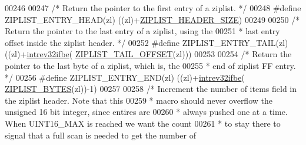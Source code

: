 \begin{DoxyCode}
00246 
00247 \textcolor{comment}{/* Return the pointer to the first entry of a ziplist. */}
00248 \textcolor{preprocessor}{#}\textcolor{preprocessor}{define} \textcolor{preprocessor}{ZIPLIST\_ENTRY\_HEAD}\textcolor{preprocessor}{(}\textcolor{preprocessor}{zl}\textcolor{preprocessor}{)}  \textcolor{preprocessor}{(}\textcolor{preprocessor}{(}\textcolor{preprocessor}{zl}\textcolor{preprocessor}{)}\textcolor{preprocessor}{+}\hyperlink{ziplist_8c_a3b8ef40d77ce00bcad424d0c07e2de95}{ZIPLIST\_HEADER\_SIZE}\textcolor{preprocessor}{)}
00249 
00250 \textcolor{comment}{/* Return the pointer to the last entry of a ziplist, using the}
00251 \textcolor{comment}{ * last entry offset inside the ziplist header. */}
00252 \textcolor{preprocessor}{#}\textcolor{preprocessor}{define} \textcolor{preprocessor}{ZIPLIST\_ENTRY\_TAIL}\textcolor{preprocessor}{(}\textcolor{preprocessor}{zl}\textcolor{preprocessor}{)}  \textcolor{preprocessor}{(}\textcolor{preprocessor}{(}\textcolor{preprocessor}{zl}\textcolor{preprocessor}{)}\textcolor{preprocessor}{+}\hyperlink{endianconv_8h_a4e85d9ae58a3b1e6ceaabfd4689002c7}{intrev32ifbe}\textcolor{preprocessor}{(}
      \hyperlink{ziplist_8c_adf2235d74c81861c85fb5d2ffa209397}{ZIPLIST\_TAIL\_OFFSET}\textcolor{preprocessor}{(}\textcolor{preprocessor}{zl}\textcolor{preprocessor}{)}\textcolor{preprocessor}{)}\textcolor{preprocessor}{)}
00253 
00254 \textcolor{comment}{/* Return the pointer to the last byte of a ziplist, which is, the}
00255 \textcolor{comment}{ * end of ziplist FF entry. */}
00256 \textcolor{preprocessor}{#}\textcolor{preprocessor}{define} \textcolor{preprocessor}{ZIPLIST\_ENTRY\_END}\textcolor{preprocessor}{(}\textcolor{preprocessor}{zl}\textcolor{preprocessor}{)}   \textcolor{preprocessor}{(}\textcolor{preprocessor}{(}\textcolor{preprocessor}{zl}\textcolor{preprocessor}{)}\textcolor{preprocessor}{+}\hyperlink{endianconv_8h_a4e85d9ae58a3b1e6ceaabfd4689002c7}{intrev32ifbe}\textcolor{preprocessor}{(}
      \hyperlink{ziplist_8c_a28b9c7884758bc2d52f204903a4bb642}{ZIPLIST\_BYTES}\textcolor{preprocessor}{(}\textcolor{preprocessor}{zl}\textcolor{preprocessor}{)}\textcolor{preprocessor}{)}\textcolor{preprocessor}{-}1\textcolor{preprocessor}{)}
00257 
00258 \textcolor{comment}{/* Increment the number of items field in the ziplist header. Note that this}
00259 \textcolor{comment}{ * macro should never overflow the unsigned 16 bit integer, since entires are}
00260 \textcolor{comment}{ * always pushed one at a time. When UINT16\_MAX is reached we want the count}
00261 \textcolor{comment}{ * to stay there to signal that a full scan is needed to get the number of}

\end{DoxyCode}
